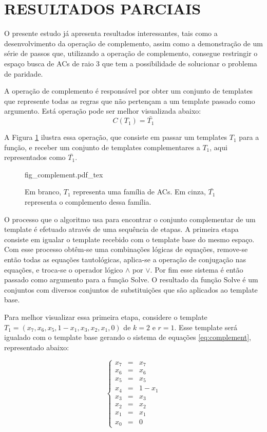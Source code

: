 \documentclass[12pt,a4paper]{article}
\let\stdsection\section
\renewcommand\section{\newpage\stdsection}
\begin{document}
\section{RESULTADOS PARCIAIS}\label{sec:aplicacao}

	O presente estudo já apresenta resultados interessantes, tais como a desenvolvimento da operação de complemento, assim como a demonstração de um série de passos que, utilizando a operação de complemento, consegue restringir o espaço busca de ACs de raio 3 que tem a possibilidade de solucionar o problema de paridade.

	A operação de complemento é responsável por obter um conjunto de templates que represente todas as regras que não pertençam a um template passado como argumento. Está operação pode ser melhor visualizada abaixo:
	\begin{equation}
	C(T_1)=\bar{T_1}
	\end{equation}

	A Figura \ref{fig:complement} ilustra essa operação, que consiste em passar um templates $T_1$ para a função, e receber um conjunto de templates complementares a $T_1$, aqui representados como $\bar{T_1}$.

	\begin{figure}[h!]
	  \centering
	  \def\svgscale{0.5}
	  {fig_complement.pdf_tex}
	  \caption{Em branco, $T_1$ representa uma família de ACs. Em cinza, $\bar{T_1}$ representa o complemento dessa família.}
	  \label{fig:complement}
	\end{figure}

	O processo que o algoritmo usa para encontrar o conjunto complementar de um template é efetuado através de uma sequência de etapas. A primeira etapa consiste em igualar o template recebido com o template base do mesmo espaço. Com esse processo obtêm-se uma combinações lógicas de equações, remove-se então todas as equações tautológicas, aplica-se a operação de conjugação nas equações, e troca-se o operador lógico $\wedge$ por $\vee$. Por fim esse sistema é então passado como argumento para a função Solve. O resultado da função Solve é um conjuntos com diversos conjuntos de substituições que são aplicados ao template base.

	Para melhor visualizar essa primeira etapa, considere o template $T_1 = (x_7, x_6, x_5, 1 - x_1, x_3, x_2, x_1, 0)$ de $k=2$ e $r=1$. Esse template será igualado com o template base gerando o sistema de equações \ref{eq:complement}, representado abaixo:
	
	\begin{equation}
	\left\{\begin{matrix}
	x_7 & = & x_7	\\ 
	x_6 & = & x_6	\\ 
	x_5 & = & x_5	\\ 
	x_4 & = & 1 - x_1 \\ 
	x_3 & = & x_3	\\ 
	x_2 & = & x_2	\\ 
	x_1 & = & x_1	\\ 
	x_0 & = & 0
	\end{matrix}\right.
	\label{eq:complement}
	\end{equation}
\end{document}
